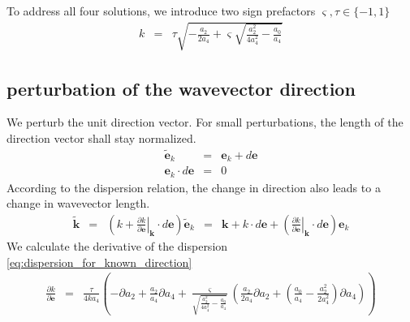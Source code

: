 \documentclass[12pt,a4paper,twoside,openright,BCOR10mm,headsepline,titlepage,abstracton,chapterprefix,final]{scrreprt}
\newcommand\Vector[1]{{\mathbf{#1}}}
\newcommand\wavenumber{k}
\newcommand\Wavevector{\Vector{\wavenumber}}
\begin{document}
To address all four solutions, we introduce two sign prefactors $\varsigma, \tau \in \{ -1,1\}$
\begin{eqnarray}
 \wavenumber &=& \tau \sqrt{ - \frac{a_2}{2 a_4} + \varsigma \sqrt{\frac{a_2^2}{4 a_4^2} - \frac{a_0}{a_4}} } \label{eq:dispersion_for_known_direction}
\end{eqnarray}

\subsection{perturbation of the wavevector direction}
We perturb the unit direction vector. For small perturbations, the length of the direction vector shall stay normalized.
\begin{eqnarray}
 \tilde{\Vector{e}}_\wavenumber &=& \Vector{e}_\wavenumber + d\Vector{e} \\
 \Vector{e}_\wavenumber \cdot d\Vector{e} &=& 0
\end{eqnarray}
According to the dispersion relation, the change in direction also leads to a change in wavevector length.
\begin{eqnarray}
 \tilde{\Wavevector} &=& 
     \left( 
         \wavenumber + \left. \frac{\partial \wavenumber}{\partial \Vector{e}}\right|_{\Wavevector} \cdot d\Vector{e} 
     \right)
     \tilde{\Vector{e}}_\wavenumber
 &=& \Wavevector + \wavenumber \cdot d\Vector{e} + \left( \left. \frac{\partial \wavenumber}{\partial \Vector{e}}\right|_{\Wavevector} \cdot d\Vector{e} \right) \Vector{e}_\wavenumber
\end{eqnarray}
We calculate the derivative of the dispersion \ref{eq:dispersion_for_known_direction}
\begin{eqnarray}
 \frac{\partial \wavenumber}{\partial \Vector{e}} &=&
     \frac{\tau}{4 \wavenumber a_4}
     \left(
         - \partial a_2 + \frac{a_2}{a_4} \partial a_4 
         +  \frac{\varsigma}{\sqrt{\frac{a_2^2}{4 a_4^2} - \frac{a_0}{a_4}}}
                \left( \frac{a_2}{2 a_4} \partial a_2 + \left( \frac{a_0}{a_4} - \frac{a_2^2}{2 a_4^2} \right) \partial a_4 \right)
     \right)
 \nonumber\\
\end{eqnarray}
\end{document}
